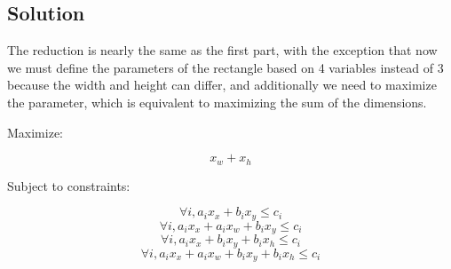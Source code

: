 \documentclass{article}
\begin{document}
\subsection{Solution}

The reduction is nearly the same as the first part, with the exception that
now we must define the parameters of the rectangle based on 4 variables
instead of 3 because the width and height can differ, and additionally we need
to maximize the parameter, which is equivalent to maximizing the sum of the
dimensions.

Maximize: 

$$x_w + x_h$$

Subject to constraints:

$$\forall i, a_i x_x + b_i x_y \leq c_i$$
$$\forall i, a_i x_x + a_i x_w + b_i x_y \leq c_i$$
$$\forall i, a_i x_x + b_i x_y + b_i x_h \leq c_i$$
$$\forall i, a_i x_x + a_i x_w + b_i x_y + b_i x_h \leq c_i$$
\end{document}
